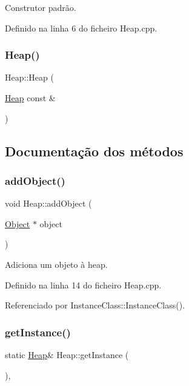 Construtor padrão. 

Definido na linha 6 do ficheiro Heap.\+cpp.

\mbox{\label{classHeap_aac9a075f0c23c3923fabbf2093386089}} 
\subsubsection{\texorpdfstring{Heap()}{Heap()}\hspace{0.1cm}{\footnotesize\ttfamily [2/2]}}
{\footnotesize\ttfamily Heap\+::\+Heap (\begin{DoxyParamCaption}\item[{\hyperlink{classHeap}{Heap} const \&}]{ }\end{DoxyParamCaption})\hspace{0.3cm}{\ttfamily [private]}}



\subsection{Documentação dos métodos}
\mbox{\label{classHeap_aa2a5f92b36abe24c83853feca936548e}} 
\subsubsection{\texorpdfstring{add\+Object()}{addObject()}}
{\footnotesize\ttfamily void Heap\+::add\+Object (\begin{DoxyParamCaption}\item[{\hyperlink{classObject}{Object} $\ast$}]{object }\end{DoxyParamCaption})}



Adiciona um objeto à heap. 



Definido na linha 14 do ficheiro Heap.\+cpp.



Referenciado por Instance\+Class\+::\+Instance\+Class().

\mbox{\label{classHeap_ac030780aeff8a27e33ed5f5eb576dfda}} 
\subsubsection{\texorpdfstring{get\+Instance()}{getInstance()}}
{\footnotesize\ttfamily static \hyperlink{classHeap}{Heap}\& Heap\+::get\+Instance (\begin{DoxyParamCaption}{ }\end{DoxyParamCaption})\hspace{0.3cm}{\ttfamily [inline]}, {\ttfamily [static]}}



